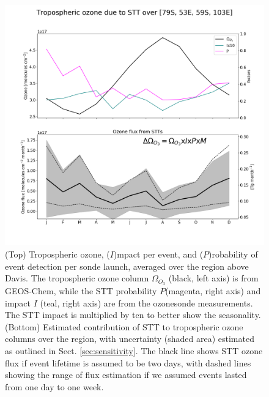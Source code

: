 \documentclass[acp, manuscript]{copernicus} %
\begin{document}
    
    \begin{figure}
      \includegraphics[width=12.0cm]{figures/STT_extrapolation_Dav.png}
      \caption{%
	(Top) Tropospheric ozone, ($I$)mpact per event, and ($P$)robability of event detection per sonde launch, averaged over the region above Davis.
	The tropospheric ozone column $\Omega_{O_3}$ (black, left axis) is from GEOS-Chem, while the STT probability  $P$(magenta, right axis) and impact $I$ (teal, right axis) are from the ozonesonde measurements.
	The STT impact is multiplied by ten to better show the seasonality.
	(Bottom) Estimated contribution of STT to tropospheric ozone columns over the region, with uncertainty (shaded area) estimated as outlined in Sect. \ref{sec:sensitivity}.
	The black line shows STT ozone flux if event lifetime is assumed to be two days, with dashed lines showing the range of flux estimation if we assumed events lasted from one day to one week.}
      \label{fig:DavExtrapolation}
    \end{figure}
    
\end{document}
